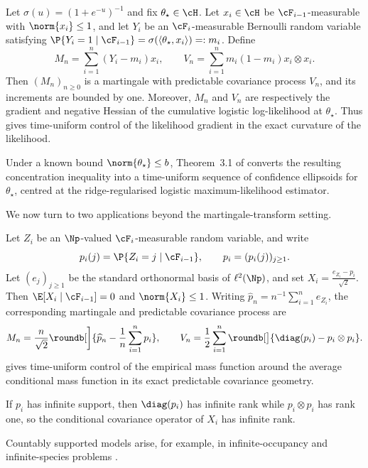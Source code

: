 \documentclass[11pt]{article}
\let\cref\zcref
\begin{document}
\begin{example}\label{ex:logistic}
Let $\sigma(u)=(1+e^{-u})^{-1}$ and fix $\theta_\star\in\cH$. Let $x_i\in\cH$ be $\cF_{i-1}$-measurable with $\norm{x_i}\leq1$, and let $Y_i$ be an $\cF_i$-measurable Bernoulli random variable satisfying $\P{Y_i=1\mid\cF_{i-1}}=\sigma(\langle\theta_\star,x_i\rangle)=:m_i$. Define
\[
  M_n=\sum_{i=1}^n(Y_i-m_i)x_i,\qquad V_n=\sum_{i=1}^nm_i(1-m_i)x_i\otimes x_i.
\]
Then $(M_n)_{n\geq0}$ is a martingale with predictable covariance process $V_n$, and its increments are bounded by one. Moreover, $M_n$ and $V_n$ are respectively the gradient and negative Hessian of the cumulative logistic log-likelihood at $\theta_\star$. Thus \cref{cor:bennett} gives time-uniform control of the likelihood gradient in the exact curvature of the likelihood.

Under a known bound $\norm{\theta_\star}\leq b$, Theorem~3.1 of \citet[]{akhavan2025bernstein} converts the resulting concentration inequality into a time-uniform sequence of confidence ellipsoids for $\theta_\star$, centred at the ridge-regularised logistic maximum-likelihood estimator.
\end{example}

We now turn to two applications beyond the martingale-transform setting.

\begin{example}\label{ex:alphabet}
Let $Z_i$ be an $\Np$-valued $\cF_i$-measurable random variable, and write
\[
  p_i(j)=\P{Z_i=j\mid\cF_{i-1}},\qquad p_i=(p_i(j))_{j\geq1}.
\]
Let $(e_j)_{j\geq1}$ be the standard orthonormal basis of $\ell^2(\Np)$, and set $X_i=\frac{e_{Z_i}-p_i}{\sqrt2}$. Then $\E[X_i\mid\cF_{i-1}]=0$ and $\norm{X_i}\leq1$. Writing $\widehat p_n=n^{-1}\sum_{i=1}^ne_{Z_i}$, the corresponding martingale and predictable covariance process are
\[
  M_n=\frac{n}{\sqrt2}\roundb[\bigg]{\widehat p_n-\frac1n\sum_{i=1}^np_i},\qquad V_n=\frac12\sum_{i=1}^n\roundb[\big]{\diag(p_i)-p_i\otimes p_i}.
\]
\cref{cor:bennett} gives time-uniform control of the empirical mass function around the average conditional mass function in its exact predictable covariance geometry.

If $p_i$ has infinite support, then $\diag(p_i)$ has infinite rank while $p_i\otimes p_i$ has rank one, so the conditional covariance operator of $X_i$ has infinite rank.

Countably supported models arise, for example, in infinite-occupancy and infinite-species problems \citep{karlin1967central,gnedin2007notes,anevski2017estimating}.
\end{example}
\end{document}
